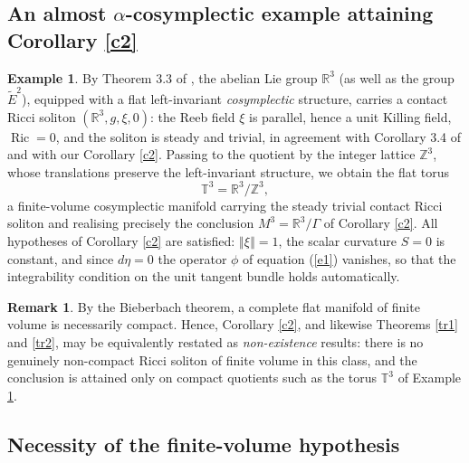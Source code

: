 \documentclass[a4paper, twoside, 10pt]{article}
\numberwithin{equation}{section}
\theoremstyle{definition}
\newtheorem{example}{Example}[section]
\newtheorem{remark}{Remark}[section]
\begin{document}
\subsection{An almost \texorpdfstring{$\alpha$}{alpha}-cosymplectic
example attaining Corollary \ref{c2}}

\begin{example}\label{ex:torus}
By Theorem 3.3 of \cite{li2022ricci}, the abelian Lie group
$\mathbb{R}^{3}$ (as well as the group $\widetilde{E}^{2}$), equipped
with a flat left-invariant \emph{cosymplectic} structure, carries a
contact Ricci soliton $\left(\mathbb{R}^{3},g,\xi,0\right)$: the Reeb
field $\xi$ is parallel, hence a unit Killing field, $\operatorname{Ric}=0$, and the
soliton is steady and trivial, in agreement with Corollary 3.4 of
\cite{li2022ricci} and with our Corollary \ref{c2}. Passing to the
quotient by the integer lattice $\mathbb{Z}^{3}$, whose translations
preserve the left-invariant structure, we obtain the flat torus
\[
\mathbb{T}^{3}=\mathbb{R}^{3}/\mathbb{Z}^{3},
\]
a finite-volume cosymplectic manifold carrying the steady trivial
contact Ricci soliton and realising precisely the conclusion
$M^{3}=\mathbb{R}^{3}/\Gamma$ of Corollary \ref{c2}. All hypotheses of
Corollary \ref{c2} are satisfied: $\left\Vert\xi\right\Vert=1$, the
scalar curvature $S=0$ is constant, and since $d\eta=0$ the operator
$\phi$ of equation (\ref{e1}) vanishes, so that the integrability
condition on the unit tangent bundle holds automatically.
\end{example}

\begin{remark}\label{rem:bieberbach}
By the Bieberbach theorem, a complete flat manifold of finite volume
is necessarily compact. Hence, Corollary \ref{c2}, and likewise
Theorems \ref{tr1} and \ref{tr2}, may be equivalently restated as
\emph{non-existence} results: there is no genuinely non-compact Ricci
soliton of finite volume in this class, and the conclusion is attained
only on compact quotients such as the torus $\mathbb{T}^{3}$ of
Example \ref{ex:torus}.
\end{remark}

\subsection{Necessity of the finite-volume hypothesis}
\end{document}
